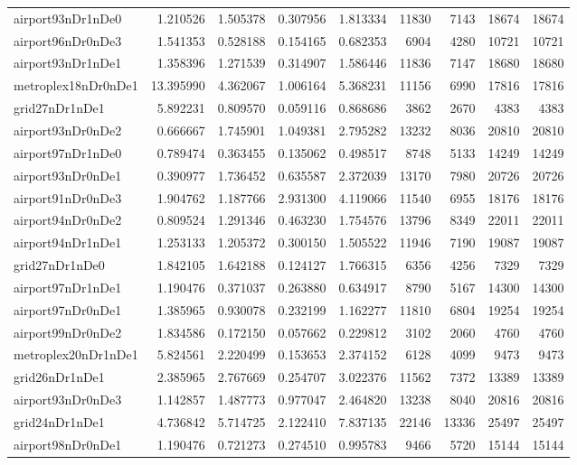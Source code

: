\begin{longtable}{|l|r|r|r|r|r|r|r|r|}
airport93nDr1nDe0 & 1.210526 & 1.505378 & 0.307956 & 1.813334 & 11830 & 7143 & 18674 & 18674 \\
airport96nDr0nDe3 & 1.541353 & 0.528188 & 0.154165 & 0.682353 & 6904 & 4280 & 10721 & 10721 \\
airport93nDr1nDe1 & 1.358396 & 1.271539 & 0.314907 & 1.586446 & 11836 & 7147 & 18680 & 18680 \\
metroplex18nDr0nDe1 & 13.395990 & 4.362067 & 1.006164 & 5.368231 & 11156 & 6990 & 17816 & 17816 \\
grid27nDr1nDe1 & 5.892231 & 0.809570 & 0.059116 & 0.868686 & 3862 & 2670 & 4383 & 4383 \\
airport93nDr0nDe2 & 0.666667 & 1.745901 & 1.049381 & 2.795282 & 13232 & 8036 & 20810 & 20810 \\
airport97nDr1nDe0 & 0.789474 & 0.363455 & 0.135062 & 0.498517 & 8748 & 5133 & 14249 & 14249 \\
airport93nDr0nDe1 & 0.390977 & 1.736452 & 0.635587 & 2.372039 & 13170 & 7980 & 20726 & 20726 \\
airport91nDr0nDe3 & 1.904762 & 1.187766 & 2.931300 & 4.119066 & 11540 & 6955 & 18176 & 18176 \\
airport94nDr0nDe2 & 0.809524 & 1.291346 & 0.463230 & 1.754576 & 13796 & 8349 & 22011 & 22011 \\
airport94nDr1nDe1 & 1.253133 & 1.205372 & 0.300150 & 1.505522 & 11946 & 7190 & 19087 & 19087 \\
grid27nDr1nDe0 & 1.842105 & 1.642188 & 0.124127 & 1.766315 & 6356 & 4256 & 7329 & 7329 \\
airport97nDr1nDe1 & 1.190476 & 0.371037 & 0.263880 & 0.634917 & 8790 & 5167 & 14300 & 14300 \\
airport97nDr0nDe1 & 1.385965 & 0.930078 & 0.232199 & 1.162277 & 11810 & 6804 & 19254 & 19254 \\
airport99nDr0nDe2 & 1.834586 & 0.172150 & 0.057662 & 0.229812 & 3102 & 2060 & 4760 & 4760 \\
metroplex20nDr1nDe1 & 5.824561 & 2.220499 & 0.153653 & 2.374152 & 6128 & 4099 & 9473 & 9473 \\
grid26nDr1nDe1 & 2.385965 & 2.767669 & 0.254707 & 3.022376 & 11562 & 7372 & 13389 & 13389 \\
airport93nDr0nDe3 & 1.142857 & 1.487773 & 0.977047 & 2.464820 & 13238 & 8040 & 20816 & 20816 \\
grid24nDr1nDe1 & 4.736842 & 5.714725 & 2.122410 & 7.837135 & 22146 & 13336 & 25497 & 25497 \\
airport98nDr0nDe1 & 1.190476 & 0.721273 & 0.274510 & 0.995783 & 9466 & 5720 & 15144 & 15144 \\

\end{longtable}
